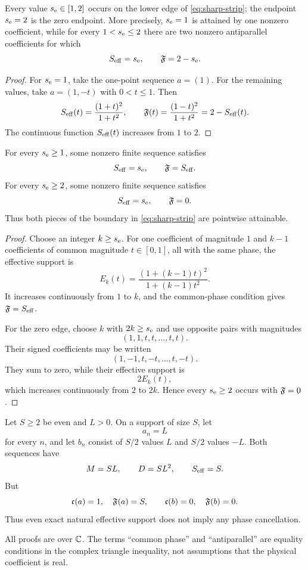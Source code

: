 \begin{proposition}
\label{prop:positive-edge-sharp}
Every value \(s_{\rm e}\in[1,2]\) occurs on the lower edge
of \eqref{eq:sharp-strip}; the endpoint \(s_{\rm e}=2\) is the zero
endpoint.  More precisely, \(s_{\rm e}=1\)
is attained by one nonzero coefficient, while for every
\(1<s_{\rm e}\le2\) there are two nonzero antiparallel coefficients
for which
\[
 S_{\mathrm{eff}}=s_{\rm e},
 \qquad
 \mathfrak F=2-s_{\rm e}.
\]
\end{proposition}

\begin{proof}
For \(s_{\rm e}=1\), take the one-point sequence \(a=(1)\).
For the remaining values, take \(a=(1,-t)\) with \(0<t\le1\).
Then
\[
 S_{\mathrm{eff}}(t)=\frac{(1+t)^2}{1+t^2},
 \qquad
 \mathfrak F(t)=\frac{(1-t)^2}{1+t^2}
 =2-S_{\mathrm{eff}}(t).
\]
The continuous function \(S_{\mathrm{eff}}(t)\) increases from \(1\) to \(2\).
\end{proof}

\begin{proposition}
\label{prop:both-edges-sharp}
For every \(s_{\rm e}\ge1\), some nonzero finite sequence satisfies
\[
 S_{\mathrm{eff}}=s_{\rm e},
 \qquad
 \mathfrak F=S_{\mathrm{eff}}.
\]
For every \(s_{\rm e}\ge2\), some nonzero finite sequence satisfies
\[
 S_{\mathrm{eff}}=s_{\rm e},
 \qquad
 \mathfrak F=0.
\]
Thus both pieces of the boundary in \eqref{eq:sharp-strip} are
pointwise attainable.
\end{proposition}

\begin{proof}
Choose an integer \(k\ge s_{\rm e}\).  For one coefficient of
magnitude \(1\) and \(k-1\) coefficients of common magnitude
\(t\in[0,1]\), all with the same phase, the effective support is
\[
 E_k(t)
 =
 \frac{(1+(k-1)t)^2}{1+(k-1)t^2}.
\]
It increases continuously from \(1\) to \(k\), and the common-phase
condition gives \(\mathfrak F=S_{\mathrm{eff}}\).

For the zero edge, choose \(k\) with \(2k\ge s_{\rm e}\) and use
opposite pairs with magnitudes
\[
 (1,1,t,t,\ldots,t,t).
\]
Their signed coefficients may be written
\[
 (1,-1,t,-t,\ldots,t,-t).
\]
They sum to zero, while their effective support is
\[
 2E_k(t),
\]
which increases continuously from \(2\) to \(2k\).  Hence every
\(s_{\rm e}\ge2\) occurs with \(\mathfrak F=0\).
\end{proof}

\begin{example}
\label{ex:same-magnitude-opposite-phase}
Let \(S\ge2\) be even and \(L>0\).  On a support of size \(S\), let
\[
 a_n=L
\]
for every \(n\), and let \(b_n\) consist of \(S/2\) values \(L\)
and \(S/2\) values \(-L\).  Both sequences have
\[
 M=SL,\qquad D=SL^2,\qquad S_{\mathrm{eff}}=S.
\]
But
\[
 \mathfrak c(a)=1,\quad \mathfrak F(a)=S,
 \qquad
 \mathfrak c(b)=0,\quad \mathfrak F(b)=0.
\]
Thus even exact natural effective support does not imply any phase
cancellation.
\end{example}

\begin{remark}
All proofs are over \(\mathbb C\).  The terms ``common phase'' and
``antiparallel'' are equality conditions in the complex triangle
inequality, not assumptions that the physical coefficient is real.
\end{remark}
